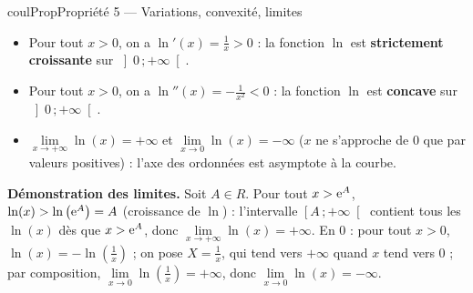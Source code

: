 \documentclass[11pt,a4paper]{article}
\makeatletter
\newcommand{\R}{\mathbb{R}}
\newcommand{\N}{\mathbb{N}}
\newcommand{\Z}{\mathbb{Z}}
\newcommand{\Q}{\mathbb{Q}}
\newcommand{\vect}[1]{\overrightarrow{#1}}
\newcommand{\fois}[1]{\times{\color{coulExo}#1}}
\newcommand{\lycee@intfo}[2]{\left[#1\,;#2\right[}
\newcommand{\lycee@intoo}[2]{\left]#1\,;#2\right[}
\providecommand{\Cf}{\mathcal{C}\sb{f}}%
\providecommand{\Cg}{\mathcal{C}\sb{g}}%
\providecommand{\intfo}{\lycee@intfo}%
\providecommand{\intoo}{\lycee@intoo}%
\newcounter{lycee@signet}
\newcommand{\signet}[3][]{\stepcounter{lycee@signet}%
  \edef\lycee@dest{\if\relax\detokenize{#1}\relax
    signet.\arabic{lycee@signet}\else#1\fi}%
  \hypertarget{\lycee@dest}{}\bookmark[level=#2,dest=\lycee@dest]{#3}}
\def\R{R}\def\N{N}\def\Z{Z}\def\Q{Q}\def\vect#1{#1}\def\Cf{Cf}\def\Cg{Cg}\def\fois#1{×#1}%
\newenvironment{proprietebox}[1][Propriété]%
  {\begin{boitecours}[phantom={\signet{2}{#1}}]{coulProp}{#1}}{\end{boitecours}}
\makeatother
\begin{document}
\begin{proprietebox}[Propriété 5 --- Variations, convexité, limites]
\begin{itemize}
  \item Pour tout $x>0$, on a $\ln'(x)=\frac{1}{x}>0$ : la fonction $\ln$ est
        \textbf{strictement croissante} sur $\intoo{0}{+\infty}$.
  \item Pour tout $x>0$, on a $\ln''(x)=-\frac{1}{x^{2}}<0$ : la fonction $\ln$ est
        \textbf{concave} sur $\intoo{0}{+\infty}$.
  \item $\lim\limits_{x\to+\infty}\ln(x)=+\infty$ \quad et \quad
        $\lim\limits_{x\to 0}\ln(x)=-\infty$ ($x$ ne s'approche de $0$ que par
        valeurs positives) : l'axe des ordonnées est asymptote à la courbe.
\end{itemize}

\textbf{\color{coulMeth}Démonstration des limites.} Soit $A\in\R$. Pour tout
$x>\mathrm{e}^{A}$, $\ln(x)>\ln\left(\mathrm{e}^{A}\right)=A$ (croissance de $\ln$) : l'intervalle
$\intfo{A}{+\infty}$ contient tous les $\ln(x)$ dès que $x>\mathrm{e}^{A}$, donc
$\lim\limits_{x\to+\infty}\ln(x)=+\infty$. En $0$ : pour tout $x>0$,
$\ln(x)=-\ln\left(\frac{1}{x}\right)$ ; on pose $X=\frac{1}{x}$, qui tend vers
$+\infty$ quand $x$ tend vers $0$ ; par composition,
$\lim\limits_{x\to 0}\ln\left(\frac{1}{x}\right)=+\infty$, donc
$\lim\limits_{x\to 0}\ln(x)=-\infty$.

\begin{center}
\end{center}
\end{proprietebox}
\end{document}
